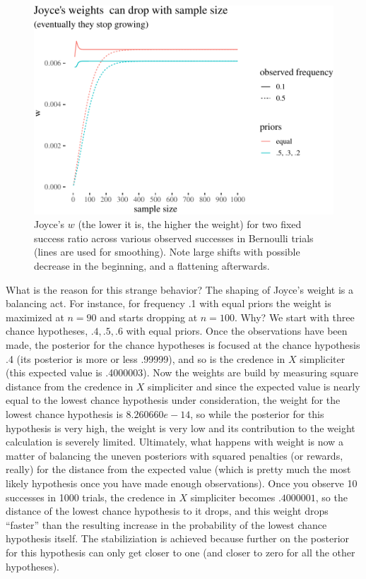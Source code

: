 \documentclass[
  10pt,
  dvipsnames,enabledeprecatedfontcommands]{scrartcl}
\begin{document}
\begin{figure}

\begin{center}\includegraphics[width=1\linewidth]{imprecision_weight_files/figure-latex/joyce3plot-1} \end{center}

\caption{Joyce's $w$ (the lower it is, the higher the weight) for two fixed success ratio across various observed successes in  Bernoulli trials (lines are used for smoothing).  Note large shifts with possible decrease in the beginning, and a flattening afterwards.}
\label{fig:joyce2}
\end{figure}

What is the reason for this strange behavior? The shaping of Joyce's
weight is a balancing act. For instance, for frequency .1 with equal
priors the weight is maximized at \(n=90\) and starts dropping at
\(n=100\). Why? We start with three chance hypotheses, \(.4, .5, .6\)
with equal priors. Once the observations have been made, the posterior
for the chance hypotheses is focused at the chance hypothesis .4 (its
posterior is more or less .99999), and so is the credence in \(X\)
simpliciter (this expected value is .4000003). Now the weights are build
by measuring square distance from the credence in \(X\) simpliciter and
since the expected value is nearly equal to the lowest chance hypothesis
under consideration, the weight for the lowest chance hypothesis is
\(8.260660e-14\), so while the posterior for this hypothesis is very
high, the weight is very low and its contribution to the weight
calculation is severely limited. Ultimately, what happens with weight is
now a matter of balancing the uneven posteriors with squared penalties
(or rewards, really) for the distance from the expected value (which is
pretty much the most likely hypothesis once you have made enough
observations). Once you observe 10 successes in 1000 trials, the
credence in \(X\) simpliciter becomes \(.4000001\), so the distance of
the lowest chance hypothesis to it drops, and this weight drops
``faster'' than the resulting increase in the probability of the lowest
chance hypothesis itself. The stabiliziation is achieved because further
on the posterior for this hypothesis can only get closer to one (and
closer to zero for all the other hypotheses).
\end{document}
